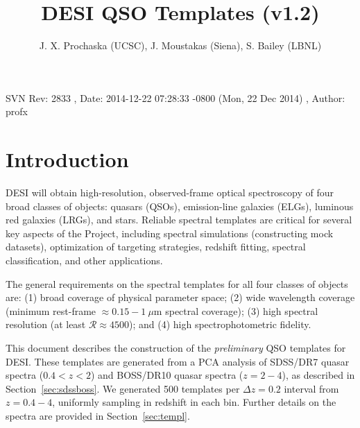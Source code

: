 \documentclass[11pt]{article}
\begin{document}
\title{
DESI QSO Templates (v1.2)
}

\author{J. X. Prochaska (UCSC), J. Moustakas (Siena), S. Bailey
  (LBNL)}
\maketitle
\begin{center}

{\small SVN $ $Rev: 2833 $ $, $ $Date: 2014-12-22 07:28:33 -0800 (Mon, 22 Dec 2014) $ $, $ $Author: profx $ $ }
\end{center}


\section{Introduction}

DESI will obtain high-resolution, observed-frame optical spectroscopy
of four broad classes of objects: quasars (QSOs), emission-line
galaxies (ELGs), luminous red galaxies (LRGs), and stars.  Reliable
spectral templates are critical for several key aspects of the
Project, including spectral simulations (constructing mock datasets),
optimization of targeting strategies, redshift fitting, spectral
classification, and other applications.

The general requirements on the spectral templates for all four
classes of objects are: (1) broad coverage of physical parameter
space; (2) wide wavelength coverage (minimum rest-frame
$\approx0.15-1~\mu$m spectral coverage); (3) high spectral
resolution (at least $\mathcal{R}\approx4500$); and (4) high
spectrophotometric fidelity.

This document describes the construction of the \emph{preliminary} QSO
templates for DESI.  These templates are generated from a PCA analysis
of SDSS/DR7 quasar spectra ($0.4<z<2$) and BOSS/DR10 quasar spectra
($z=2-4$), as described in Section~\ref{sec:sdssboss}.  We generated
500 templates per $\Delta z = 0.2$ interval from $z=0.4 - 4$,
uniformly sampling in redshift in each bin.  Further details on the
spectra are provided in Section~\ref{sec:templ}.
\end{document}
